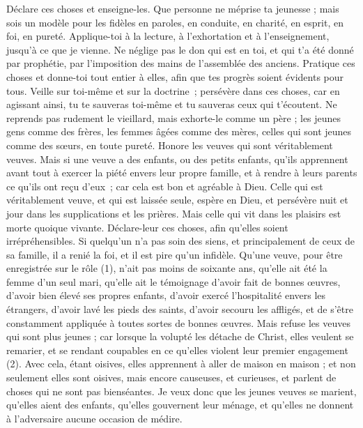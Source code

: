 \begin{multicols}{2}
Déclare ces choses et enseigne-les.
Que personne ne méprise ta jeunesse ; mais sois un modèle pour les fidèles en paroles, en conduite, en charité, en esprit, en foi, en pureté.
Applique-toi à la lecture, à l'exhortation et à l’enseignement, jusqu'à ce que je vienne.
Ne néglige pas le don qui est en toi, et qui t'a été donné par prophétie, par l'imposition des mains de l’assemblée des anciens.
Pratique ces choses et donne-toi tout entier à elles, afin que tes progrès soient évidents pour tous.
Veille sur toi-même et sur la doctrine ; persévère dans ces choses, car en agissant ainsi, tu te sauveras toi-même et tu sauveras ceux qui t'écoutent.
\VerseOne{}Ne reprends pas rudement le vieillard, mais exhorte-le comme un père ; les jeunes gens comme des frères,
les femmes âgées comme des mères, celles qui sont jeunes comme des sœurs, en toute pureté.
Honore les veuves qui sont véritablement veuves.
Mais si une veuve a des enfants, ou des petits enfants, qu'ils apprennent avant tout à exercer la piété envers leur propre famille, et à rendre à leurs parents ce qu’ils ont reçu d’eux ; car cela est bon et agréable à Dieu.
Celle qui est véritablement veuve, et qui est laissée seule, espère en Dieu, et persévère nuit et jour dans les supplications et les prières.
Mais celle qui vit dans les plaisirs est morte quoique vivante.
Déclare-leur ces choses, afin qu'elles soient irrépréhensibles.
Si quelqu'un n'a pas soin des siens, et principalement de ceux de sa famille, il a renié la foi, et il est pire qu'un infidèle.
Qu’une veuve, pour être enregistrée sur le rôle (1), n’ait pas moins de soixante ans, qu’elle ait été la femme d’un seul mari,
qu’elle ait le témoignage d'avoir fait de bonnes œuvres, d'avoir bien élevé ses propres enfants, d'avoir exercé l’hospitalité envers les étrangers, d'avoir lavé les pieds des saints, d'avoir secouru les affligés, et de s'être constamment appliquée à toutes sortes de bonnes œuvres.
Mais refuse les veuves qui sont plus jeunes ; car lorsque la volupté les détache de Christ, elles veulent se remarier,
et se rendant coupables en ce qu’elles violent leur premier engagement (2).
Avec cela, étant oisives, elles apprennent à aller de maison en maison ; et non seulement elles sont oisives, mais encore causeuses, et curieuses, et parlent de choses qui ne sont pas bienséantes.
Je veux donc que les jeunes veuves se marient, qu'elles aient des enfants, qu'elles gouvernent leur ménage, et qu'elles ne donnent à l'adversaire aucune occasion de médire.

\end{multicols}

